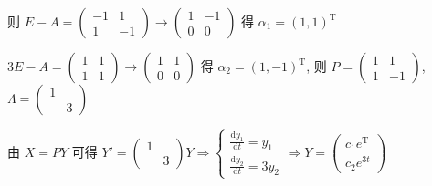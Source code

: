 \begin{enumerate}
                   则 \( E-A = \begin{pmatrix}
                       -1 & 1  \\
                       1  & -1
                   \end{pmatrix} \rightarrow \begin{pmatrix}
                       1 & -1 \\
                       0 & 0
                   \end{pmatrix} \) 得 \( \alpha_{1} = (1, 1)^{\mathrm{T}} \)

                   \( 3E-A = \begin{pmatrix}
                       1 & 1 \\
                       1 & 1
                   \end{pmatrix} \rightarrow \begin{pmatrix}
                       1 & 1 \\
                       0 & 0
                   \end{pmatrix} \) 得 \( \alpha_{2} = (1, -1)^{\mathrm{T}} \), 则 \( P = \begin{pmatrix}
                       1 & 1  \\
                       1 & -1
                   \end{pmatrix} \), \( \Lambda = \begin{pmatrix}
                       1 &   \\
                         & 3
                   \end{pmatrix} \)

                   由 \( X = P Y \) 可得 \( Y' = \begin{pmatrix}
                       1 &   \\
                         & 3
                   \end{pmatrix} Y \Rightarrow \begin{cases}
                       \frac{\mathrm{d}y_{1}}{\mathrm{d}t} = y_{1} \\
                       \frac{\mathrm{d}y_{2}}{\mathrm{d}t} = 3y_{2}
                   \end{cases} \Rightarrow Y = \begin{pmatrix}
                       c_{1}e^{\mathrm{T}} \\
                       c_{2}e^{3t}
                   \end{pmatrix} \)


\end{enumerate}
